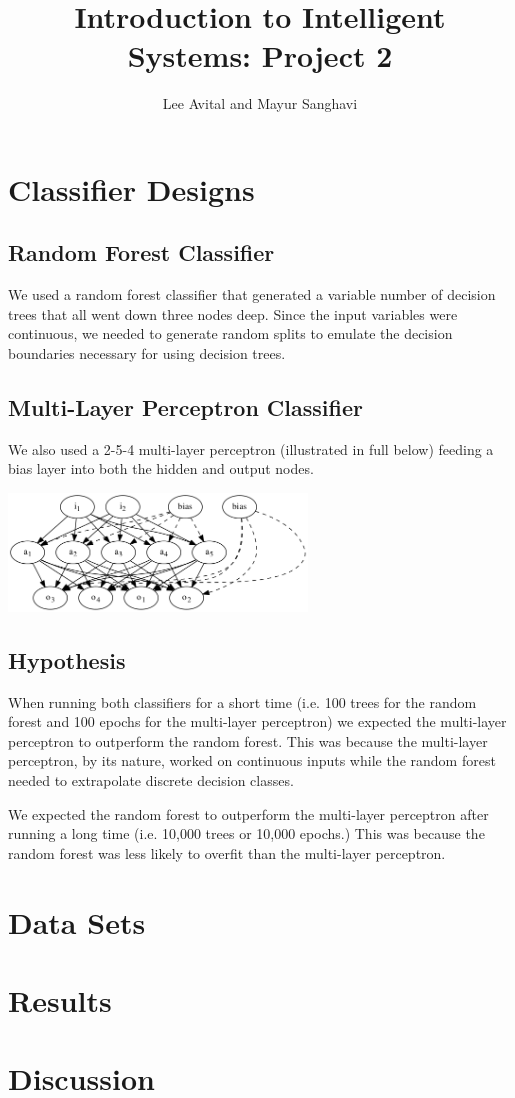 \documentclass{article}
\title{Introduction to Intelligent Systems: Project 2}
\author{Lee Avital and Mayur Sanghavi}
\begin{document}
\maketitle


\section{Classifier Designs}

\subsection{Random Forest Classifier}

We used a random forest classifier that generated a variable number of decision trees that all went down three
nodes deep. Since the input variables were continuous, we needed to generate random splits to
emulate the decision boundaries necessary for using decision trees.

\subsection{Multi-Layer Perceptron Classifier}

We also used a 2-5-4 multi-layer perceptron (illustrated in full below) feeding a bias layer into
both the hidden and output nodes.

\includegraphics[width=300px]{1_net.png}

\subsection{Hypothesis}


When running both classifiers for a short time (i.e. 100 trees for the random forest and 100
epochs for the multi-layer perceptron) we expected the multi-layer perceptron to outperform the random forest.
This was because the multi-layer perceptron, by its nature, worked on continuous inputs while
the random forest needed to extrapolate discrete decision classes.

We expected the random forest to outperform the multi-layer perceptron after running a long
time (i.e. 10,000 trees or 10,000 epochs.) This was because the random forest was less likely to
overfit than the multi-layer perceptron.



\section{Data Sets}


\section{Results}



\section{Discussion}
\end{document}

